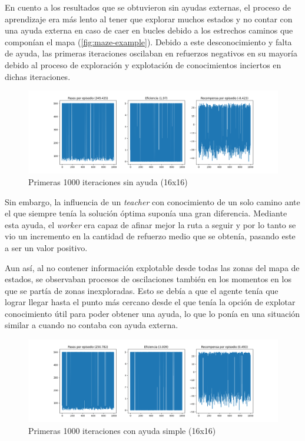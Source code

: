 \documentclass[letterpaper]{article} %
\begin{document}
En cuento a los resultados que se obtuvieron sin ayudas externas, el proceso de aprendizaje era más lento al tener que explorar muchos estados y
 no contar con una ayuda externa en caso de caer en bucles debido a los estrechos caminos que componían el mapa (\ref{fig:maze-example}). Debido
  a este desconocimiento y falta de ayuda, las primeras iteraciones oscilaban en refuerzos negativos en su mayoría debido al proceso de exploración
   y explotación de conocimientos inciertos en dichas iteraciones. 

\begin{figure}[H]
    \centering
    \includegraphics[width=0.9\columnwidth]{sin_ayuda_externa.png}
    \caption{Primeras 1000 iteraciones sin ayuda (16x16)\label{fig:FuN1}}
\end{figure}

Sin embargo, la influencia de un \textit{teacher} con conocimiento de un solo camino ante el que siempre tenía la solución óptima suponía una gran diferencia.
 Mediante esta ayuda, el \textit{worker} era capaz de afinar mejor la ruta a seguir y por lo tanto se vio un incremento en la cantidad de refuerzo medio que 
 se obtenía, pasando este a ser un valor positivo.

Aun así, al no contener información explotable desde todas las zonas del mapa de estados, se observaban procesos de oscilaciones también en los momentos
 en los que se partía de zonas inexploradas. Esto se debía a que el agente tenía que lograr llegar hasta el punto más cercano desde el que tenía la opción 
 de explotar conocimiento útil para poder obtener una ayuda, lo que lo ponía en una situación similar a cuando no contaba con ayuda externa.

\begin{figure}[H]
    \centering
    \includegraphics[width=0.9\columnwidth]{ayuda_externa_1path.png}
    \caption{Primeras 1000 iteraciones con ayuda simple (16x16)\label{fig:FuN2}}
    
\end{figure}
\end{document}
